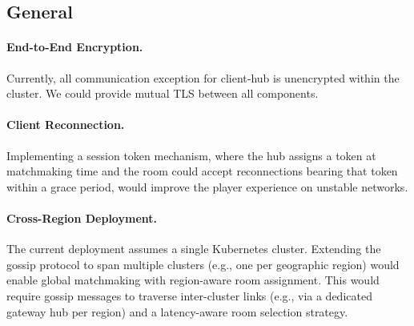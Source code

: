 \subsection{General}

\paragraph{End-to-End Encryption.}
Currently, all communication exception for client-hub is unencrypted within the cluster.
We could provide mutual TLS between all components.

\paragraph{Client Reconnection.}
Implementing a session token mechanism, where the hub assigns a token at matchmaking time and the room could accept reconnections bearing that token within a grace period, would improve the player experience on unstable networks.

\paragraph{Cross-Region Deployment.}
The current deployment assumes a single Kubernetes cluster.
Extending the gossip protocol to span multiple clusters (e.g., one per geographic region) would enable global matchmaking with region-aware room assignment.
This would require gossip messages to traverse inter-cluster links (e.g., via a dedicated gateway hub per region) and a latency-aware room selection strategy.